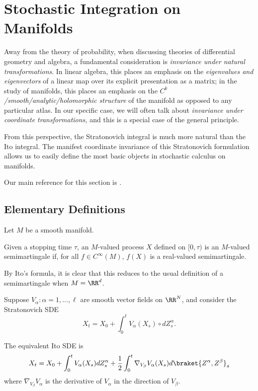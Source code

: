 \documentclass{scrartcl}
\begin{document}
\section{Stochastic Integration on Manifolds}

Away from the theory of probability, when discussing theories of differential geometry and algebra, a fundamental consideration is \emph{invariance under natural transformations}. In linear algebra, this places an emphasis on the \emph{eigenvalues and eigenvectors} of a linear map over its explicit presentation as a matrix; in the study of manifolds, this places an emphasis on the \emph{$C^k$/smooth/analytic/holomorphic structure} of the manifold as opposed to any particular atlas. In our specific case, we will often talk about \emph{invariance under coordinate transformations,} and this is a special case of the general principle.

From this perspective, the Stratonovich integral is much more natural than the Ito integral. The manifest coordinate invariance of this Stratonovich formulation allows us to easily define the most basic objects in stochastic calculus on manifolds.

Our main reference for this section is \cite{Hsu2002}.

\subsection{Elementary Definitions}

Let $M$ be a smooth manifold.

\begin{defn}
    Given a stopping time $\tau$, an $M$-valued process $X$ defined on $[0,\tau)$ is an $M$-valued semimartingale if, for all $f\in C^\infty(M)$, $f(X)$ is a real-valued semimartingale.
\end{defn}

By Ito's formula, it is clear that this reduces to the usual definition of a semimartingale when $M = \RR^d$.


Suppose $V_\alpha: \alpha = 1,\dots, \ell$ are smooth vector fields on $\RR^N$, and consider the Stratonovich SDE
\[
    X_t = X_0 + \int_0^t V_\alpha(X_s)\circ dZ^\alpha_s.    
\]

The equivalent Ito SDE is
\[
    X_t = X_0 + \int_0^t V_\alpha(X_s) dZ^\alpha_s + \frac{1}{2} \int_0^t \nabla_{V_\beta} V_\alpha(X_s) d\braket{Z^\alpha, Z^\beta}_s
\]
where $\nabla_{V_\beta} V_\alpha$ is the derivative of $V_\alpha$ in the direction of $V_\beta$.
\end{document}

